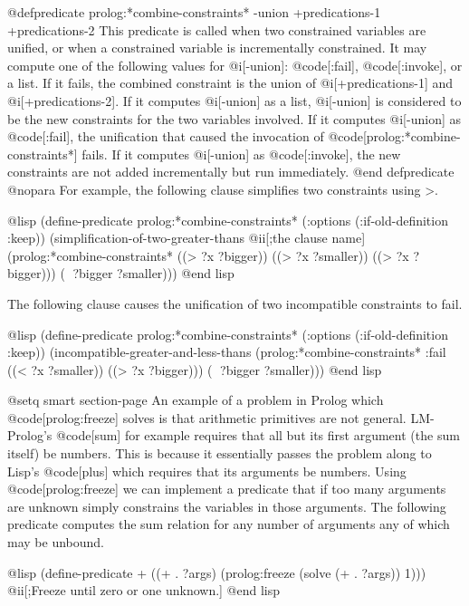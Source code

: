 {@defpredicate prolog:*combine-constraints* -union +predications-1 +predications-2
This predicate is called when two constrained variables are unified,
or when a constrained variable is incrementally constrained.
It may compute one of the following values for @i[-union]:
@code[:fail], @code[:invoke], or a list.
If it fails, the combined constraint is
the union of @i[+predications-1] and @i[+predications-2].
If it computes @i[-union] as a list, 
@i[-union] is considered to be
the new constraints for the two variables involved.
If it computes @i[-union] as @code[:fail],
the unification that caused the invocation of @code[prolog:*combine-constraints*]
fails.
If it computes @i[-union] as @code[:invoke],
the new constraints are not added incrementally but run immediately.
@end defpredicate
@nopara
For example, the following clause simplifies two constraints using >.

@lisp
(define-predicate prolog:*combine-constraints*
  (:options (:if-old-definition :keep))
  (simplification-of-two-greater-thans @ii[;the clause name]
   (prolog:*combine-constraints* ((> ?x ?bigger))
                                 ((> ?x ?smaller))
			         ((> ?x ?bigger)))
   ( ?bigger ?smaller)))
@end lisp

The following clause causes the unification of two incompatible constraints to
fail. 

@lisp
(define-predicate prolog:*combine-constraints*
  (:options (:if-old-definition :keep))
  (incompatible-greater-and-less-thans
   (prolog:*combine-constraints* :fail
            	                 ((< ?x ?smaller))
			         ((> ?x ?bigger)))
   ( ?bigger ?smaller)))
@end lisp

@setq smart section-page
An example of a problem in Prolog which @code[prolog:freeze] solves is that
arithmetic primitives are not general.
LM-Prolog's @code[sum] for example requires that all but its first argument
(the sum itself) be numbers.
This is because it essentially passes the problem along to Lisp's @code[plus]
which requires that its arguments be numbers.
Using @code[prolog:freeze] we can implement a predicate that if too many 
arguments are unknown simply constrains the variables in those arguments.
The following predicate computes the sum relation for any number of arguments
any of which may be unbound.

@lisp
(define-predicate +
  ((+ . ?args)
   (prolog:freeze (solve (+ . ?args)) 1))) @ii[;Freeze until zero or one unknown.]
@end lisp

}
